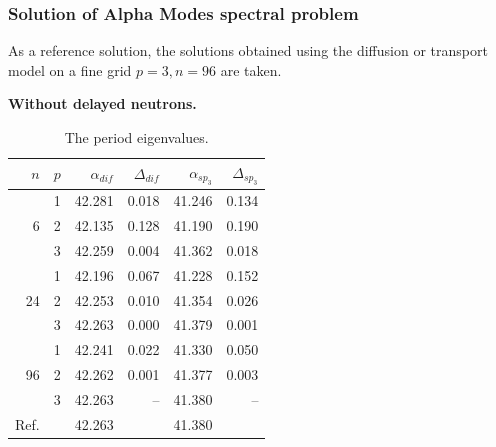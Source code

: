 \documentclass[authoryear]{elsarticle}
\begin{document}
\subsubsection{Solution of Alpha Modes spectral problem}
As a reference solution, the solutions obtained using the diffusion or transport model on a fine grid $ p = 3, n = 96 $ are taken.

\textbf{Without delayed neutrons.}


\begin{table}[h]
\caption{The period eigenvalues.}
\label{tab:hwr_alpha}
\begin{center}
\begin{tabular}{rrrrrr}
\hline
$n$ & $p$ & $\alpha_{dif}$ & $\Delta_{dif}$ &$\alpha_{sp_3}$& $\Delta_{sp_3}$ \\
\hline
	& 1	&42.281 & 0.018 & 41.246 & 0.134\\
6	& 2	&42.135 & 0.128 & 41.190 & 0.190\\
	& 3	&42.259 & 0.004 & 41.362 & 0.018\\ 
\hline
	& 1	&42.196 & 0.067 & 41.228 & 0.152\\
24& 2	&42.253 & 0.010 & 41.354 & 0.026\\
	& 3	&42.263 & 0.000 & 41.379 & 0.001\\ 
\hline
	& 1	&42.241 & 0.022 & 41.330 & 0.050\\
96& 2	&42.262 & 0.001 & 41.377 & 0.003\\
	& 3	&42.263 &    -- & 41.380 & -- \\ 
\hline
Ref.& & 42.263 & & 41.380 \\ 
\hline
\end{tabular}
\end{center}
\end{table}
\end{document}
